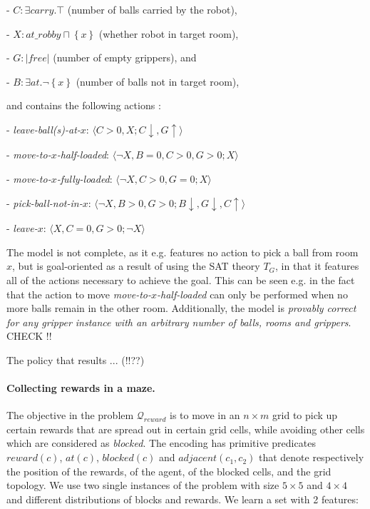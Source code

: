 \documentclass[letterpaper]{article} %
\newcommand{\tuple}[1]{\ensuremath{\langle #1 \rangle}}
\newcommand{\set}[1]{\ensuremath{\left\{#1 \right\}}}
\newcommand{\abs}[1]{\ensuremath{\left\vert{#1}\right\vert}}
\newcommand{\Q}{\mathcal{Q}}
\begin{document}
- $C: \exists carry . \top$ (number of balls carried by the robot), 

- $X: at\_robby \sqcap \set{x}$ (whether robot in target room),

- $G: \abs{free}$ (number of empty grippers), and

- $B: \exists at . \neg \set{x}$ (number of balls not in target room),


\noindent and contains the following actions :

- \emph{leave-ball(s)-at-$x$}: \tuple{C>0, X;  C\downarrow, G \uparrow}

- \emph{move-to-$x$-half-loaded}: \tuple{\neg X, B=0, C>0, G>0;   X}

- \emph{move-to-$x$-fully-loaded}: \tuple{\neg X, C>0, G=0;   X}

- \emph{pick-ball-not-in-$x$}: \tuple{\neg X, B > 0, G > 0;   B \downarrow, G \downarrow, C\uparrow}

- \emph{leave-$x$}: \tuple{X, C=0, G > 0;   \neg X}


The model is not complete, as it e.g. features no action to pick a ball from room $x$,
but is goal-oriented as a result of using the SAT theory $T_G$, in that it features all of the actions
necessary to achieve the goal.
This can be seen e.g. in the fact that the action to move \emph{move-to-$x$-half-loaded}
can only be performed when no more balls remain in the other room.
Additionally, the model is \emph{provably correct for any gripper instance with an arbitrary number of balls, 
rooms and grippers}. CHECK !!

The policy that results ... (!!??)



% 
% 
% 
% 




\paragraph{Collecting rewards in a maze.}
The objective in the problem $\Q_{reward}$ is to move in an $n \times m$ grid to pick up certain
rewards that are spread out in certain grid cells, while avoiding other cells which are considered as \emph{blocked}.
The encoding has primitive predicates $reward(c)$, $at(c)$, $blocked(c)$ and $adjacent(c_1, c_2)$ that denote
respectively the position of the rewards, of the agent, of the blocked cells, and the grid topology.
We use two single instances of the problem with size $5 \times 5$ and $4 \times 4$ and different distributions of blocks and rewards.
We learn a set with 2 features:
\end{document}
